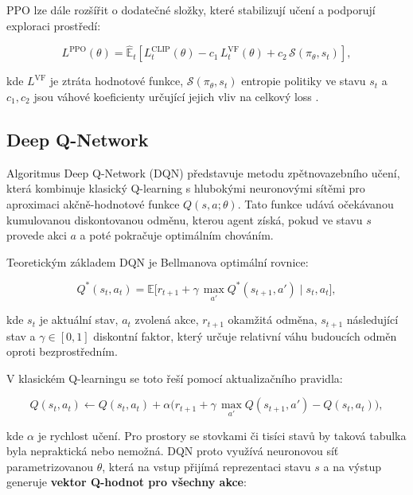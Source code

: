 PPO lze dále rozšířit o dodatečné složky, které stabilizují učení a podporují exploraci prostředí:

\begin{equation}
L^{\text{PPO}}(\theta) =
\hat{\mathbb{E}}_t\left[L^{\text{CLIP}}_t(\theta)-c_1\,L^{\text{VF}}_t(\theta)+c_2\,\mathcal{S}(\pi_\theta,s_t)\right],
\end{equation}

kde $L^{\text{VF}}$ je ztráta hodnotové funkce, $\mathcal{S}(\pi_\theta,s_t)$ entropie politiky ve
stavu $s_t$ a $c_1,c_2$ jsou váhové koeficienty určující jejich vliv na celkový loss \cite{Schulman2017}.

\newpage

\subsection{Deep Q-Network}

Algoritmus Deep Q-Network (DQN)\cite{Sutton2018}\cite{Mnih2013}\cite{Jochec2024}\cite{Mnih2015} představuje metodu zpětnovazebního učení, která kombinuje klasický Q-learning\cite{QLearning} s hlubokými neuronovými sítěmi pro aproximaci akčně-hodnotové funkce \(Q(s,a;\theta)\). Tato funkce udává očekávanou kumulovanou diskontovanou odměnu, kterou agent získá, pokud ve stavu \(s\) provede akci \(a\) a poté pokračuje optimálním chováním.

Teoretickým základem DQN je Bellmanova optimální rovnice:

\begin{equation}
Q^*(s_t,a_t)=\mathbb{E}\Big[r_{t+1}+\gamma\,\max_{a'}Q^*(s_{t+1},a')\;\Big|\;s_t,a_t\Big],
\end{equation}

kde \(s_t\) je aktuální stav, \(a_t\) zvolená akce, \(r_{t+1}\) okamžitá odměna, \(s_{t+1}\) následující stav a \(\gamma\in[0,1]\) diskontní faktor, který určuje relativní váhu budoucích odměn oproti bezprostředním.

V klasickém Q-learningu se toto řeší pomocí aktualizačního pravidla:

\begin{equation}
Q(s_t,a_t)\leftarrow Q(s_t,a_t)+\alpha\Big(r_{t+1}+\gamma\,\max_{a'}Q(s_{t+1},a')-Q(s_t,a_t)\Big),
\end{equation}

kde \(\alpha\) je rychlost učení. Pro prostory se stovkami či tisíci stavů by taková tabulka byla nepraktická nebo nemožná. DQN proto využívá neuronovou síť parametrizovanou \(\theta\), která na vstup přijímá reprezentaci stavu \(s\) a na výstup generuje \textbf{vektor Q-hodnot pro všechny akce}:

